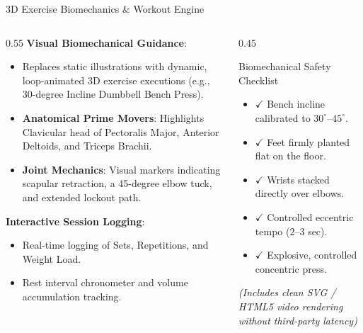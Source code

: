 \documentclass[aspectratio=169,10pt]{beamer}
\begin{document}
\begin{frame}{3D Exercise Biomechanics \& Workout Engine}
  \begin{columns}[T]
    \begin{column}{0.55\textwidth}
      \textbf{Visual Biomechanical Guidance}:
      \begin{itemize}
        \item Replaces static illustrations with dynamic, loop-animated 3D exercise executions (e.g., 30-degree Incline Dumbbell Bench Press).
        \item \textbf{Anatomical Prime Movers}: Highlights Clavicular head of Pectoralis Major, Anterior Deltoids, and Triceps Brachii.
        \item \textbf{Joint Mechanics}: Visual markers indicating scapular retraction, a 45-degree elbow tuck, and extended lockout path.
      \end{itemize}
      \vspace{0.2cm}
      \textbf{Interactive Session Logging}:
      \begin{itemize}
        \item Real-time logging of Sets, Repetitions, and Weight Load.
        \item Rest interval chronometer and volume accumulation tracking.
      \end{itemize}
    \end{column}
    \begin{column}{0.45\textwidth}
      \begin{exampleblock}{Biomechanical Safety Checklist}
        \begin{itemize}
          \item $\checkmark$ Bench incline calibrated to $30^{\circ}$--$45^{\circ}$.
          \item $\checkmark$ Feet firmly planted flat on the floor.
          \item $\checkmark$ Wrists stacked directly over elbows.
          \item $\checkmark$ Controlled eccentric tempo ($2$--$3$ sec).
          \item $\checkmark$ Explosive, controlled concentric press.
        \end{itemize}
      \end{exampleblock}
      \begin{center}
        \textit{(Includes clean SVG / HTML5 video rendering without third-party latency)}
      \end{center}
    \end{column}
  \end{columns}
\end{frame}
\end{document}
